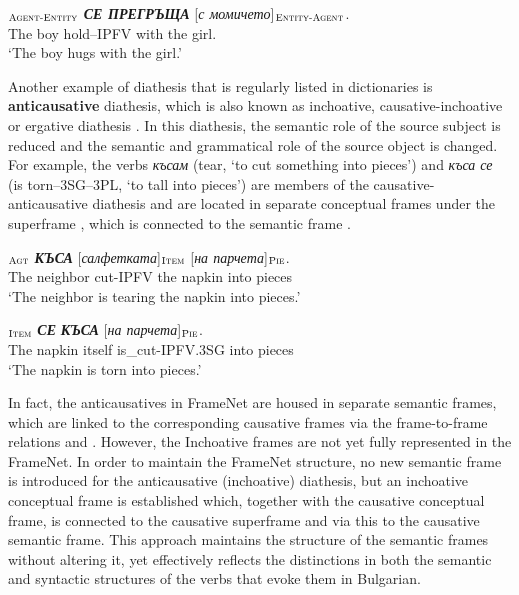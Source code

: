 \documentclass[output=paper,colorlinks,citecolor=brown]{langscibook}
\begin{document}
 \begin{exe}
 \ex  \label{ch01:ex:12}
 $_{\text{\textsc{Agent-Entity}}}$   \textit{\textbf{СЕ ПРЕГРЪЩА}}  [\textit{с момичето}]$_{\text{\textsc{Entity-Agent}}}$.\\
{The boy}  hold--IPFV {with the girl}. \\
 \glt `The boy hugs with the girl.' 
 \end{exe}

Another example of diathesis that is regularly listed in dictionaries is \textbf{anticausative} diathesis, which is also known as inchoative, causative-inchoative or ergative diathesis \citep[27]{Levin:93}. In this diathesis, the semantic role of the source subject is reduced and the semantic and grammatical role of the source object is changed. For example, the verbs \textit{късам} (tear, `to cut something into pieces') and \textit{къса се} (is torn--3SG--3PL, `to tall into pieces') are members of the causative-anticausative diathesis and are located in separate conceptual frames under the superframe , which is connected to the semantic frame .

\begin{exe}
 \ex  \label{ch01:ex:13}
 $_{\text{\textsc{Agt}}}$   \textit{\textbf{КЪСА}}  [\textit{салфетката}]$_{\text{\textsc{Item}}}$ [\textit{на парчета}]$_{\text{\textsc{Pie}}}$.\\
{The neighbor}  cut-IPFV {the napkin} {into pieces} \\
 \glt `The neighbor is tearing the napkin into pieces.' 
 \end{exe}
 
\begin{exe}
 \ex  \label{ch01:ex:14}
$_{\text{\textsc{Item}}}$   \textit{\textbf{СЕ}} \textit{\textbf{КЪСА}} [\textit{на парчета}]$_{\text{\textsc{Pie}}}$.\\
{The napkin}  itself is\_cut-IPFV.3SG {into pieces} \\
\glt `{The napkin is torn into pieces}.'
\end{exe}

In fact, the anticausatives in FrameNet are housed in separate semantic frames, which are linked to the corresponding causative frames via the frame-to-frame relations  and . However, the Inchoative frames are not yet fully represented in the FrameNet. In order to maintain the FrameNet structure, no new semantic frame is introduced for the anticausative (inchoative) diathesis, but an inchoative conceptual frame is established which, together with the causative conceptual frame, is connected to the causative superframe and via this to the causative semantic frame. This approach maintains the structure of the semantic frames without altering it, yet effectively reflects the distinctions in both the semantic and syntactic structures of the verbs that evoke them in Bulgarian.
\end{document}
